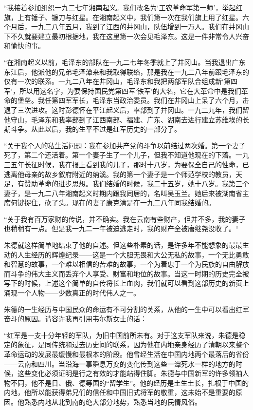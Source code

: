 \documentclass[10pt]{book}
\begin{document}
“我接着参加组织一九二七年湘南起义。我们改名为‘工农革命军第一师’，举起红旗，上有锤子、镰刀与红星。在湘南起义中，我们第一次在我们旗上用了红星。六个月后，一九二八年五月，我到了江西的井冈山，队伍增到一万人。我们在井冈山下不久就要建立最初根据地，我在这里第一次会见毛泽东。这是一件非常令人兴奋和愉快的事。

“在湘南起义以前，毛泽东的部队在一九二七年冬季就上了井冈山。当我退出广东东江后，他派他的兄弟毛泽潭来和我取得联络，那是我在一九二八年前跟毛泽东的仅有一次的联系。一九二八年在井冈山，毛泽东和我把两部军队合组成新‘第四军’，所以用这名字，为要保持国民党第四军‘铁军’的大名，它在大革命中是我们革命的堡垒。我任第四军军长，毛泽东当政治委员。我们在井冈山上呆了六个月，击退了三次进攻。这时彭德怀在平江起义后，率部到了井冈山。一九二九年，我们留他守山，毛泽东和我率部到了江西南部、福建、广东、湖南去进行建立苏维埃的长期斗争。从此以后，我的生平不过是红军历史的一部分了。

“关于我个人的私生活问题：我在参加共产党的斗争以前结过两次婚。第一个妻子死了，第二个还活着。第一个妻子生了一个儿子，但我不知道他现在的下落。一九三五年长征时候，我在报上看到我的儿子，那时十八岁，为要保全自己的性命，已逃离他母亲的故乡叙府附近的纳溪。我的第一个妻子是一个师范学校的教员，天足，有赞助革命的进步思想。我们结婚的时候，我二十五岁，她十八岁。我第三个妻子，是一九二八年湘南起义时期内跟我同居的，名叫吴玉兰。她后来被湖南省主席何键捉住，砍了头。现在的妻子康克清是在一九二八年同我结婚的。

“关于我有百万家财的传说，并不确实。我在云南有些财产，但并不多，我的妻子也稍稍有一点。但是我一九二一年被迫逃走时，我的财产全被唐继尧没收了。“

朱德就这样简单地结束了他的自述。但这些朴素的话，是许多年不能想象的最最生动的人生经历的辉煌纪录——这是一个大胆无畏和大公无私的故事，一个无比勇敢和智慧的故事，一个难以相信的苦难的故事，一个为着忠于一个为民族的自由解放而斗争的伟大主义而丢弃个人享受、财富和地位的故事。当这一时期的历史完全被写下的时候，上述这个简单的自传将长上血肉，我们就可以看到这部历史的新页上涌现一个人物——少数真正的时代伟人之一。

朱德的一生经历与中国民众的命运有不可分割的关系，从他的一生中可以看出红军奋斗的原因。请容许我再引用韦尔斯女士的话：

“红军是一支十分年轻的军队，为旧中国前所未有。对于这支军队来说，朱德是稳定的象征，是同传统和过去历史间的联系，因为他在内地亲身经历了清朝以来整个革命运动的发展最缓慢和最根本的阶段。他曾经生活在中国内地两个最落后的省份——云南和四川。当沿海一事瞬息万变的变化传到这些一潭死水一样的地方的时候，这些变化必须证明是行之有效的才能站得住脚。朱德与中国新军的许多领袖人物不同，他不是日、俄、德等国的“留学生”。他的经历是土生土长，扎根于中国的内地，他所以能获得弟兄们的信任和中国旧式将军的敬重，这未始不是重要的原因。他熟悉内地从北到南的绝大部分地势，熟悉当地的民情风俗。
\end{document}
